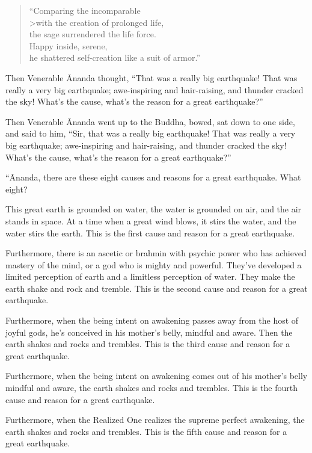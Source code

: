 \documentclass[12pt,openany]{book}%
\begin{document}
\begin{verse}%
“Comparing the incomparable \\>with the creation of prolonged life, \\
the sage surrendered the life force. \\
Happy inside, serene, \\
he shattered self-creation like a suit of armor.” 

%
\end{verse}

Then Venerable Ānanda thought, “That was a really big earthquake! That was really a very big earthquake; awe-inspiring and hair-raising, and thunder cracked the sky! What’s the cause, what’s the reason for a great earthquake?” 

Then Venerable Ānanda went up to the Buddha, bowed, sat down to one side, and said to him, “Sir, that was a really big earthquake! That was really a very big earthquake; awe-inspiring and hair-raising, and thunder cracked the sky! What’s the cause, what’s the reason for a great earthquake?” 

“Ānanda, there are these eight causes and reasons for a great earthquake. What eight? 

This great earth is grounded on water, the water is grounded on air, and the air stands in space. At a time when a great wind blows, it stirs the water, and the water stirs the earth. This is the first cause and reason for a great earthquake. 

Furthermore, there is an ascetic or brahmin with psychic power who has achieved mastery of the mind, or a god who is mighty and powerful. They’ve developed a limited perception of earth and a limitless perception of water. They make the earth shake and rock and tremble. This is the second cause and reason for a great earthquake. 

Furthermore, when the being intent on awakening passes away from the host of joyful gods, he’s conceived in his mother’s belly, mindful and aware. Then the earth shakes and rocks and trembles. This is the third cause and reason for a great earthquake. 

Furthermore, when the being intent on awakening comes out of his mother’s belly mindful and aware, the earth shakes and rocks and trembles. This is the fourth cause and reason for a great earthquake. 

Furthermore, when the Realized One realizes the supreme perfect awakening, the earth shakes and rocks and trembles. This is the fifth cause and reason for a great earthquake. 
\end{document}
